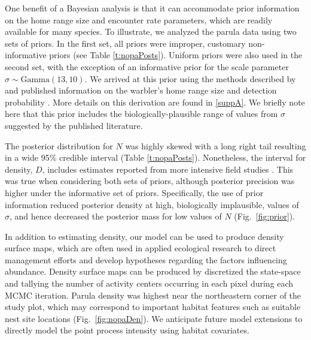 One benefit of a Bayesian analysis is that it can accommodate prior
information on the home range size and encounter rate parameters,
which are readily available for many
species. To illustrate, we analyzed the parula data using two sets of
priors. In the first set, all priors were
improper, customary non-informative priors (see Table \ref{t:nopaPosts}).
Uniform priors were also used in the second set, with the exception of
an informative prior for the scale parameter $\sigma \sim
\mbox{Gamma}(13,10)$. We arrived at this prior using the methods
described by \citet{royle_etal:2011mee} and published
information on the warbler's home range size and detection probability
\citep{moldenhaer_regelski_1996,simons_etal:2009}. More details on this
derivation are found in \ref{suppA}. We briefly note here that this prior
includes the biologically-plausible range of values from $\sigma$
suggested by the published literature.

The posterior distribution for
$N$ was highly skewed with a long right tail resulting in a wide 95\%
credible interval (Table \ref{t:nopaPosts}). Nonetheless, the interval
for density, $D$, includes estimates reported from more intensive field
studies \citep[][]{moldenhaer_regelski_1996}. This was true when
considering
both sets of priors, although posterior precision was higher under the
informative set of priors. Specifically, the use of prior information
reduced posterior density at high, biologically implausible,
values of $\sigma$, and hence decreased the posterior mass for
low values of $N$ (Fig.~\ref{fig:prior}).

In addition to estimating density, our model can be used to produce
density surface maps, which are often used in applied ecological
research to direct management efforts and develop hypotheses regarding
the factors influencing abundance.
Density surface maps can be produced by discretized the
state-space and tallying the number of activity centers occurring in
each pixel during each MCMC iteration. Parula density was
highest near the northeastern corner of the study plot, which may
correspond to important habitat features such as suitable nest site
locations (Fig.~\ref{fig:nopaDen}). We anticipate future model
extensions to directly model the
point process intensity using habitat covariates.


